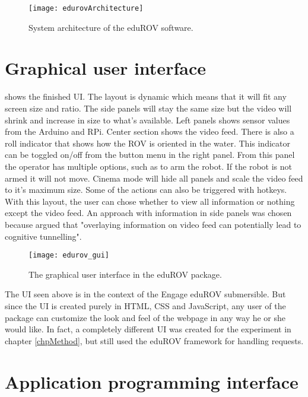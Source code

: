 \begin{figure}[h!]
    \centering
    \texttt{[image: edurovArchitecture]}
    \caption{System architecture of the eduROV software.}
    \label{edurovArchitecture}
\end{figure}

\section{Graphical user interface}

 shows the finished UI. The layout is dynamic which means that it will fit any screen size and ratio. The side panels will stay the same size but the video will shrink and increase in size to what's available. Left panels shows sensor values from the Arduino and RPi. Center section shows the video feed. There is also a roll indicator that shows how the ROV is oriented in the water. This indicator can be toggled on/off from the button menu in the right panel. From this panel the operator has multiple options, such as to arm the robot. If the robot is not armed it will not move. Cinema mode will hide all panels and scale the video feed to it's maximum size. Some of the actions can also be triggered with hotkeys. With this layout, the user can chose whether to view all information or nothing except the video feed. An approach with information in side panels was chosen because \citet{Chen2007} argued that "overlaying information on video feed can potentially lead to cognitive tunnelling".

\begin{figure}[h!]
    \centering
    \texttt{[image: edurov\_gui]}
    \caption{The graphical user interface in the eduROV package.}
    \label{edurov_gui}
\end{figure}

The UI seen above is in the context of the Engage eduROV submersible. But since the UI is created purely in HTML, CSS and JavaScript, any user of the package can customize the look and feel of the webpage in any way he or she would like. In fact, a completely different UI was created for the experiment in chapter \ref{chpMethod}, but still used the eduROV framework for handling requests.

\section{Application programming interface}

